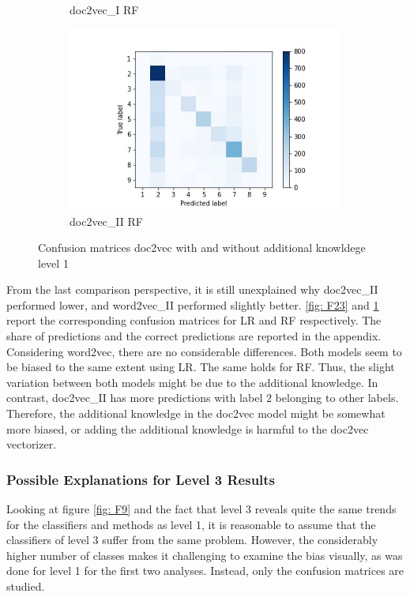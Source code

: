 \documentclass[12pt, a4paper, titlepage]{article}
\begin{document}
\begin{figure}[]
\begin{subfigure}[b]{0.475\textwidth}
    {{\small doc2vec\_I RF}}    
  \end{subfigure}
  \hfill
  \begin{subfigure}[b]{0.475\textwidth}   
      \centering 
      \includegraphics[width=\textwidth]{cm_doc2vec_with_RF.jpg}
      {{\small doc2vec\_II RF}}    
  \end{subfigure}
  \caption{\label{fig: F24} Confusion matrices doc2vec with and without additional knowldege level 1}
\end{figure}

\FloatBarrier
From the last comparison perspective, it is still unexplained why doc2vec\_II performed lower, and word2vec\_II performed slightly better. \ref{fig: F23} and \ref{fig: F24} report the corresponding confusion matrices for \ac{LR} and \ac{RF} respectively. The share of predictions and the correct predictions are reported in the appendix. Considering word2vec, there are no considerable differences. Both models seem to be biased to the same extent using \ac{LR}. The same holds for \ac{RF}. Thus, the slight variation between both models might be due to the additional knowledge. In contrast, doc2vec\_II has more predictions with label $2$ belonging to other labels. Therefore, the additional knowledge in the doc2vec model might be somewhat more biased, or adding the additional knowledge is harmful to the doc2vec vectorizer. 

\subsubsection*{Possible Explanations for Level 3 Results}
Looking at figure \ref{fig: F9} and the fact that level 3 reveals quite the same trends for the classifiers and methods as level 1, it is reasonable to assume that the classifiers of level 3 suffer from the same problem. However, the considerably higher number of classes makes it challenging to examine the bias visually, as was done for level 1 for the first two analyses. Instead, only the confusion matrices are studied.
\end{document}
